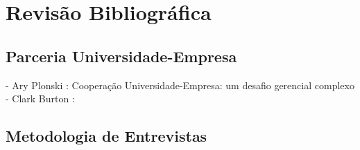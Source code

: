 \chapter[Revisão Bibliográfica]{Revisão Bibliográfica}
\label{chap:revisao}

\section{Parceria Universidade-Empresa}
\label{cha:ensino}

- Ary Plonski : Cooperação Universidade-Empresa: um desafio gerencial complexo
- Clark Burton :

\section{Metodologia de Entrevistas}
\label{cha:ensino}

